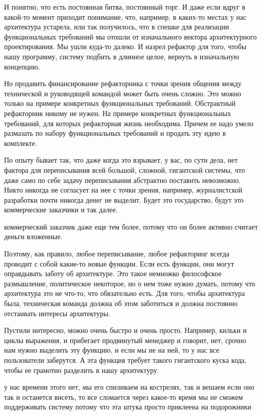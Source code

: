 И понятно, что есть постоянная битва, постоянный торг. И даже если вдруг в какой-то момент приходит понимание, что, например, в каких-то местах у нас архитектура устарела, или так получилось, что в спешке для реализации функциональных требований мы отошли от изначального вектора архитектурного проектирования. Мы ушли куда-то далеко. И назрел рефактор для того, чтобы нашу программу, систему подбить в длинное целое, вернуть в изначальную концепцию.

Но продавить финансирование рефакторника с точки зрения общения между технической и руководящей командой может быть очень сложно. Это можно только на примере конкретных функциональных требований. Обстрактный рефакторник никому не нужен. На примере конкретных функциональных требований, для которых рефакторная жизнь необходима. Причем ее надо умело размазать по набору функциональных требований и продать эту идею в комплекте.

По опыту бывает так, что даже когда это взрывает, у вас, по сути дела, нет фактора для переписывания всей большой, сложной, гигантской системы, что даже само по себе задачу переписывания абстрактно поставить невозможно. Никто никогда не согласует на нее с точки зрения, например, журналистской разработки почти никогда денег не выделит. Будет это государство, будут это коммерческие заказчики и так далее.

коммерческий заказчик даже еще тем более, потому что он более активно считает деньги вложенные.

Поэтому, как правило, любое переписывание, любое рефакторинг всегда проводит с собой какие-то новые функции. Если есть функции, они могут оправдывать заботу об архитектуре. Это такое немножко философское размышление, политическое некоторое, но о нем тоже нужно думать, потому что архитектура это не что-то, что обязательно есть. Для того, чтобы архитектура была, техническая команда должна об этом заботиться и должна постоянно отстаивать интересы архитектуры.

Пустили интересно, можно очень быстро и очень просто. Например, кильки и циклы выражения, и прибегает продвинутый менеджер и говорит, нет, срочно нам нужно выделить эту функцию, и если мы не на ней, то у нас все пользователи заберутся. А эта функция требует такого гигантского куска кода, чтобы ее грамотно разделить в нашу архитектуру.

у нас времени этого нет, мы его спиливаем на кострелях, так и вешаем если оно так и останется висеть, то все сломается через какое-то время мы не сможем поддерживать систему потому что эта штука просто приклеена на подорожники


